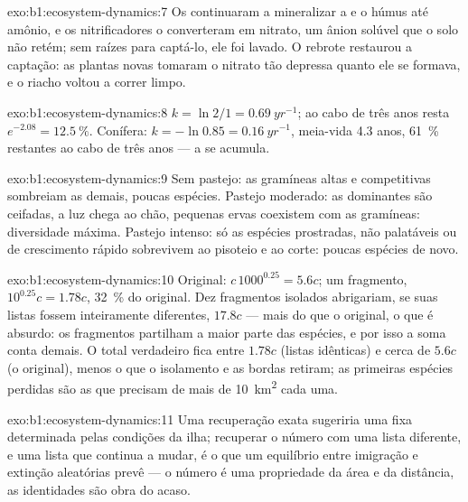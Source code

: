 \begin{solution}{exo:b1:ecosystem-dynamics:7}
Os  continuaram a mineralizar a  e o húmus
até amônio, e os nitrificadores o converteram em nitrato, um ânion
solúvel que o solo não retém; sem raízes para captá-lo, ele foi
lavado. O rebrote restaurou a captação: as plantas novas tomaram o
nitrato tão depressa quanto ele se formava, e o riacho voltou a correr
limpo.
\end{solution}

\begin{solution}{exo:b1:ecosystem-dynamics:8}
$k = \ln 2/1 = \qty{0.69}{yr^{-1}}$; ao cabo de três anos resta
$e^{-2.08} =
\qty{12.5}{\%}$. Conífera: $k = -\ln 0.85 = \qty{0.16}{yr^{-1}}$,
meia-vida \num{4.3} anos, \qty{61}{\%} restantes ao cabo de três anos
--- a  se acumula.
\end{solution}

\begin{solution}{exo:b1:ecosystem-dynamics:9}
Sem pastejo: as gramíneas altas e competitivas sombreiam as demais,
poucas espécies. Pastejo moderado: as dominantes são ceifadas, a luz
chega ao chão, pequenas ervas coexistem com as gramíneas: diversidade
máxima. Pastejo intenso: só as espécies prostradas, não palatáveis ou
de crescimento rápido sobrevivem ao pisoteio e ao corte: poucas
espécies de novo.
\end{solution}

\begin{solution}{exo:b1:ecosystem-dynamics:10}
Original: $c\,1000^{0.25} = 5.6c$; um fragmento, $10^{0.25}c = 1.78c$,
\qty{32}{\%} do original. Dez fragmentos isolados abrigariam, se suas
listas fossem inteiramente diferentes, $17.8c$ --- mais do que o
original, o que é absurdo: os fragmentos partilham a maior parte das
espécies, e por isso a soma conta demais. O total verdadeiro fica
entre $1.78c$ (listas idênticas) e cerca de $5.6c$ (o original), menos
o que o isolamento e as bordas retiram; as primeiras espécies perdidas
são as que precisam de mais de \qty{10}{km^2} cada uma.
\end{solution}

\begin{solution}{exo:b1:ecosystem-dynamics:11}
Uma recuperação exata sugeriria uma  fixa determinada pelas
condições da ilha; recuperar o número com uma lista diferente, e uma
lista que continua a mudar, é o que um equilíbrio entre imigração e
extinção aleatórias prevê --- o número é uma propriedade da área e da
distância, as identidades são obra do acaso.
\end{solution}

